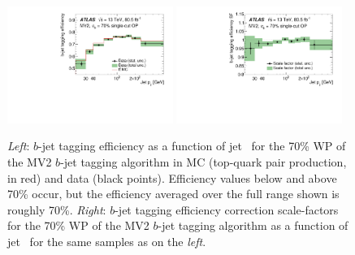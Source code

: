 \begin{figure}[!htb]
    \begin{center}
        \includegraphics[width=0.48\textwidth]{figures/chapter3/ftag/ftag_eff_70_pt}
        \includegraphics[width=0.48\textwidth]{figures/chapter3/ftag/ftag_sf_70_pt}
        \caption{
            \textit{Left}: $b$-jet tagging efficiency as a function of jet \pT~for the 70\% WP of the MV2 $b$-jet
                tagging algorithm in MC (top-quark pair production, in red) and data (black points).
                Efficiency values below and above 70\% occur, but the efficiency averaged over
                the full range shown is roughly 70\%. 
            \textit{Right}: $b$-jet tagging efficiency correction scale-factors for the 70\% WP of the MV2 $b$-jet
                tagging algorithm as a function of jet \pT~for the same
                samples as on the \textit{left}.
        }
        \label{fig:btag_eff_sf}
    \end{center}
\end{figure}



\FloatBarrier
